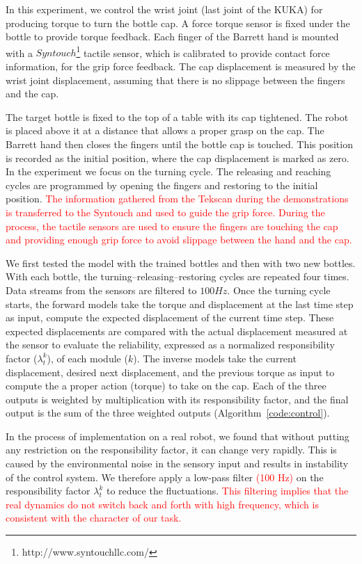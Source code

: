 In this experiment, we control the wrist joint (last joint of the KUKA)
for producing torque to turn the bottle cap. A force torque sensor is
fixed under the bottle to provide torque feedback. Each finger of the
Barrett hand is mounted with a
$Syntouch$\footnote{http://www.syntouchllc.com/} tactile sensor, which
is calibrated to provide contact force information, for the grip force
feedback. The cap displacement is measured by the wrist joint
displacement, assuming that there is no slippage between the fingers and
the cap.

The target bottle is fixed to the top of a table with its cap
tightened. The robot is placed above it at a distance that allows a
proper grasp on the cap. The Barrett hand then closes the fingers until
the bottle cap is touched. This position is recorded as the initial
position, where the cap displacement is marked as zero. In the
experiment we focus on the turning cycle. The releasing and reaching
cycles are programmed by opening the fingers and restoring to the
initial position. \textcolor{red}{ The information gathered from the Tekscan during the demonstrations is transferred to the Syntouch and used to guide the grip force. During the process, the tactile sensors are used to ensure the fingers are touching the cap and providing enough grip force to avoid slippage between the hand and the cap.}

We first tested the model with the trained bottles and then with two
new bottles. With each bottle, the turning--releasing--restoring cycles
are repeated four times. Data streams from the sensors are filtered to
$100Hz$. Once the turning cycle starts, the forward models take the
torque and displacement at the last time step as input, compute the
expected displacement of the current time step. These expected
displacements are compared with the actual displacement measured at
the sensor to evaluate the reliability, expressed as a normalized
responsibility factor ($\lambda_t^k$), of each module ($k$). The inverse models
take the current displacement, desired next displacement, and the
previous torque as input to compute the a proper action
(torque) to take on the cap. Each of the three outputs is weighted by
multiplication with its responsibility factor, and the final output is the sum of the three weighted outputs (Algorithm~\ref{code:control}).

In the process of implementation on a real robot, we found that
without putting any restriction on the responsibility factor, it can
change very rapidly. This is caused by the environmental noise in the
sensory input and results in instability of the control system. We
therefore apply a low-pass filter \textcolor{red}{(100 Hz)} on the responsibility factor
$\lambda_t^k$ to reduce the fluctuations. \textcolor{red}{This filtering implies that
the real dynamics do not switch back and forth with high frequency, which is consistent
with the character of our task.} %

